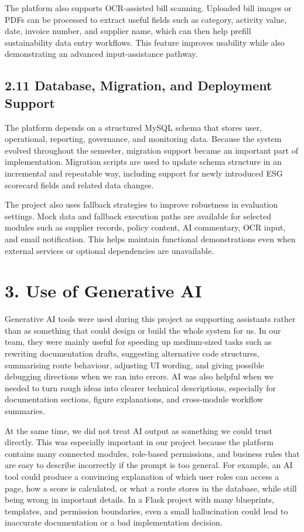 \documentclass[10pt,a4paper]{article}
\begin{document}
The platform also supports OCR-assisted bill scanning. Uploaded bill images or PDFs can be processed to extract useful fields such as category, activity value, date, invoice number, and supplier name, which can then help prefill sustainability data entry workflows. This feature improves usability while also demonstrating an advanced input-assistance pathway.

\subsection*{2.11 Database, Migration, and Deployment Support}
The platform depends on a structured MySQL schema that stores user, operational, reporting, governance, and monitoring data. Because the system evolved throughout the semester, migration support became an important part of implementation. Migration scripts are used to update schema structure in an incremental and repeatable way, including support for newly introduced ESG scorecard fields and related data changes.

The project also uses fallback strategies to improve robustness in evaluation settings. Mock data and fallback execution paths are available for selected modules such as supplier records, policy content, AI commentary, OCR input, and email notification. This helps maintain functional demonstrations even when external services or optional dependencies are unavailable.

\section*{3. Use of Generative AI}
Generative AI tools were used during this project as supporting assistants rather than as something that could design or build the whole system for us. In our team, they were mainly useful for speeding up medium-sized tasks such as rewriting documentation drafts, suggesting alternative code structures, summarising route behaviour, adjusting UI wording, and giving possible debugging directions when we ran into errors. AI was also helpful when we needed to turn rough ideas into clearer technical descriptions, especially for documentation sections, figure explanations, and cross-module workflow summaries.

At the same time, we did not treat AI output as something we could trust directly. This was especially important in our project because the platform contains many connected modules, role-based permissions, and business rules that are easy to describe incorrectly if the prompt is too general. For example, an AI tool could produce a convincing explanation of which user roles can access a page, how a score is calculated, or what a route stores in the database, while still being wrong in important details. In a Flask project with many blueprints, templates, and permission boundaries, even a small hallucination could lead to inaccurate documentation or a bad implementation decision.
\end{document}

